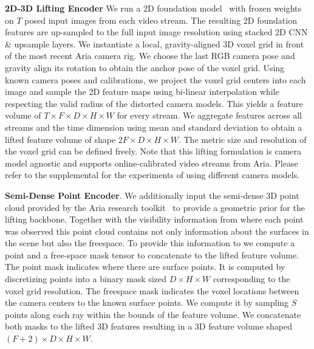 \noindent\textbf{2D-3D Lifting Encoder} We run a 2D foundation model~\cite{oquab2023dinov2} with frozen weights on $T$ posed input images from each video stream. The resulting 2D foundation features are up-sampled to the full input image resolution using stacked 2D CNN \& upsample layers.  
%
We instantiate a local, gravity-aligned 3D voxel grid in front of the most recent Aria camera rig. We choose the last RGB camera pose and gravity align its rotation to obtain the anchor pose of the voxel grid.
%
Using known camera poses and calibrations, we project the voxel grid centers into each image and sample the 2D feature maps using bi-linear interpolation while respecting the valid radius of the distorted camera models.
This yields a feature volume of $T\times F \times D\times H\times W$ for every stream. 
We aggregate features across all streams and the time dimension using mean and standard deviation to obtain a lifted feature volume of shape $2F \times D\times H\times W$.
The metric size and resolution of the voxel grid can be defined freely. 
%
Note that this lifting formulation is camera model agnostic and supports online-calibrated video streams from Aria. Please refer to the supplemental for the experiments of \EFMmodel{} using different camera models.

\noindent\textbf{Semi-Dense Point Encoder}. We additionally input the semi-dense 3D point cloud provided by the Aria research toolkit~\cite{engel2023project} to provide a geometric prior for the lifting backbone. Together with the visibility information from where each point was observed this point cloud contains not only information about the surfaces in the scene but also the freespace. To provide this information to \EFMmodel{} we compute a point and a free-space mask tensor to concatenate to the lifted feature volume. 
The point mask indicates where there are surface points. It is computed by discretizing points into a binary mask sized $D\times H\times W$ corresponding to the voxel grid resolution.
The freespace mask indicates the voxel locations between the camera centers to the known surface points.
We compute it by sampling $S$ points along each ray within the bounds of the feature volume. 
We concatenate both masks to the lifted 3D features resulting in a 3D feature volume shaped $(F+2)\times D\times H\times W$.

